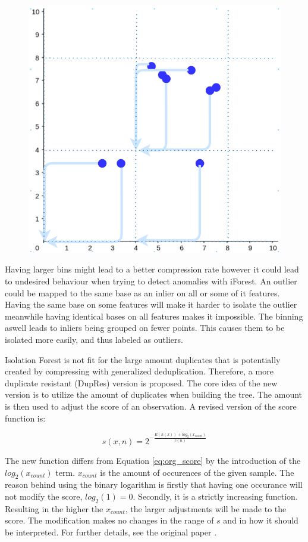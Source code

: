 \begin{figure}
  \centering
  \includegraphics[width=0.5\linewidth]{images/binning-2dev.png}
  \caption{}
  \label{fig:binning}
\end{figure}

Having larger bins might lead to a better compression rate however it could lead to undesired behaviour when trying to detect anomalies with iForest. An outlier could be mapped to the same base as an inlier on all or some of it features. Having the same base on some features will make it harder to isolate the outlier meanwhile having identical bases on all features makes it impossible. The binning aswell leads to inliers being grouped on fewer points. This causes them to be isolated more easily, and thus labeled as outliers.   

Isolation Forest is not fit for the large amount duplicates that is potentially created by compressing with generalized deduplication. Therefore, a more duplicate resistant (DupRes) version is proposed. The core idea of the new version is to utilize the amount of duplicates when building the tree. The amount is then used to adjust the score of an observation. A revised version of the score function is: 

\begin{equation}
  s(x,n) = 2^{-\frac{E(h(x))+log_2(x_{count})}{c(n)}}
  \label{eq:dupres_score}
\end{equation}     
 
The new function differs from Equation \ref{eq:org_score} by the introduction of the $log_2(x_{count})$ term. $x_{count}$ is the amount of occurences of the given sample. The reason behind using the binary logarithm is firstly that having one occurance will not modify the score, $log_2(1)=0$. Secondly, it is a strictly increasing function. Resulting in the higher the $x_{count}$, the larger adjustments will be made to the score. The modification makes no changes in the range of $s$ and in how it should be interpreted. For further details, see the original paper \cite{iforest}.     

